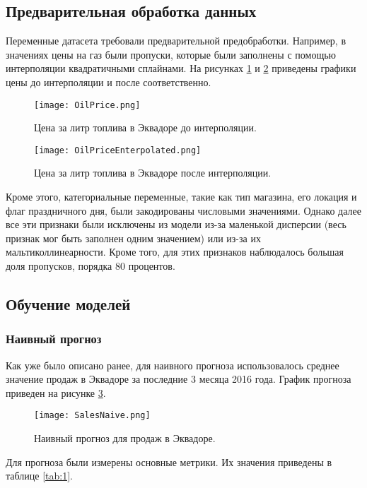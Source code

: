 \documentclass[]{article}
\begin{document}
\subsection{Предварительная обработка данных}

Переменные датасета требовали предварительной предобработки. Например, в значениях цены на газ были пропуски, которые были заполнены с помощью интерполяции квадратичными сплайнами. На рисунках \ref{price_raw} и \ref{price_solid} приведены графики цены до интерполяции и после соответственно.

\begin{figure}[h!]
	\centering
	\texttt{[image: OilPrice.png]}
	\caption{Цена за литр топлива в Эквадоре до интерполяции.}
	\label{price_raw}
\end{figure}


\begin{figure}[h!]
	\centering
	\texttt{[image: OilPriceEnterpolated.png]}
	\caption{Цена за литр топлива в Эквадоре после интерполяции.}
	\label{price_solid}
\end{figure}

Кроме этого, категориальные переменные, такие как тип магазина, его локация и флаг праздничного дня, были закодированы числовыми значениями. Однако далее все эти признаки были исключены из модели из-за маленькой дисперсии (весь признак мог быть заполнен одним значением) или из-за их мальтиколлинеарности. Кроме того, для этих признаков наблюдалось большая доля пропусков, порядка 80 процентов.

\subsection{Обучение моделей}

\subsubsection{Наивный прогноз}

Как уже было описано ранее, для наивного прогноза использовалось среднее значение продаж в Эквадоре за последние 3 месяца 2016 года. График прогноза приведен на рисунке \ref{naive}.

\begin{figure}[h!]
	\centering
	\texttt{[image: SalesNaive.png]}
	\caption{Наивный прогноз для продаж в Эквадоре.}
	\label{naive}
\end{figure}

Для прогноза были измерены основные метрики. Их значения приведены в таблице \ref{tab:1}.
\end{document}
